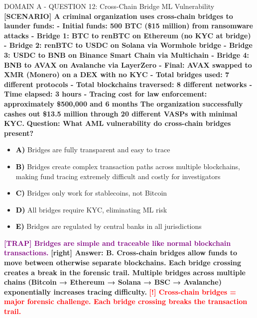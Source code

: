 \documentclass[11pt,a4paper]{beamer}
\newcommand{\redflag}[1]{\textcolor{red}{\textbf{[!] #1}}}
\newcommand{\trap}[1]{\textcolor{purple}{\textbf{[TRAP] #1}}}
\newcommand{\correct}[1]{\textcolor{green!50!black}{\textbf{[right] #1}}}
\newcommand{\scenario}[1]{\textcolor{blue!70!black}{\textbf{[SCENARIO] #1}}}
\newcommand{\option}[1]{\textcolor{black}{\textbf{#1}}}
\begin{document}
\begin{frame}{DOMAIN A - QUESTION 12: Cross-Chain Bridge ML Vulnerability}
\scenario{A criminal organization uses cross-chain bridges to launder funds:
- Initial funds: 500 BTC (\$15 million) from ransomware attacks
- Bridge 1: BTC to renBTC on Ethereum (no KYC at bridge)
- Bridge 2: renBTC to USDC on Solana via Wormhole bridge
- Bridge 3: USDC to BNB on Binance Smart Chain via Multichain
- Bridge 4: BNB to AVAX on Avalanche via LayerZero
- Final: AVAX swapped to XMR (Monero) on a DEX with no KYC
- Total bridges used: 7 different protocols
- Total blockchains traversed: 8 different networks
- Time elapsed: 3 hours
- Tracing cost for law enforcement: approximately \$500,000 and 6 months
The organization successfully cashes out \$13.5 million through 20 different VASPs with minimal KYC.}
\vspace{0.2cm}
\textbf{Question: What AML vulnerability do cross-chain bridges present?}
\vspace{0.1cm}
\begin{itemize}
    \item \option{A)} Bridges are fully transparent and easy to trace
    \item \option{B)} Bridges create complex transaction paths across multiple blockchains, making fund tracing extremely difficult and costly for investigators
    \item \option{C)} Bridges only work for stablecoins, not Bitcoin
    \item \option{D)} All bridges require KYC, eliminating ML risk
    \item \option{E)} Bridges are regulated by central banks in all jurisdictions
\end{itemize}
\vspace{0.2cm}
\trap{Bridges are simple and traceable like normal blockchain transactions.}
\correct{Answer: B. Cross-chain bridges allow funds to move between otherwise separate blockchains. Each bridge crossing creates a break in the forensic trail. Multiple bridges across multiple chains (Bitcoin → Ethereum → Solana → BSC → Avalanche) exponentially increases tracing difficulty.}
\redflag{Cross-chain bridges = major forensic challenge. Each bridge crossing breaks the transaction trail.}
\end{frame}

\end{document}
